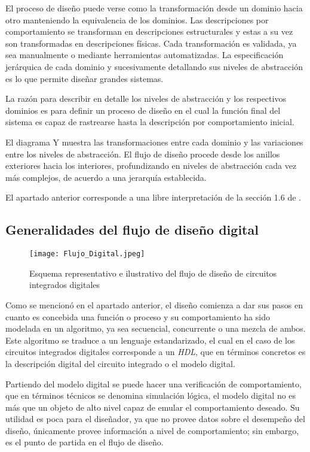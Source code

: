 {El proceso de diseño puede verse como la transformación desde un dominio hacia otro manteniendo la equivalencia de los dominios. Las descripciones por comportamiento se transforman en descripciones estructurales y estas a su vez son transformadas en descripciones físicas. Cada transformación es validada, ya sea manualmente o mediante herramientas automatizadas. La especificación jerárquica de cada dominio y sucesivamente detallando sus niveles de abstracción es lo que permite diseñar grandes sistemas. 

La razón para describir en detalle los niveles de abstracción y los respectivos dominios es para definir un proceso de diseño en el cual la función final del sistema es capaz de rastrearse hasta la descripción por comportamiento inicial.

El diagrama Y muestra las transformaciones entre cada dominio y las variaciones entre los niveles de abstracción. El flujo de diseño procede desde los anillos exteriores hacia los interiores, profundizando en niveles de abstracción cada vez más complejos, de acuerdo a una jerarquía establecida.

El apartado anterior corresponde a una libre interpretación de la sección 1.6 de \cite{book:weste2005}.

\subsection{Generalidades del flujo de diseño digital}
\label{sec:gen_d_flow}
\begin{figure}[t]
\texttt{[image: Flujo\_Digital.jpeg]}
\centering
\caption{Esquema representativo e ilustrativo del flujo de diseño de circuitos integrados digitales}
\label{Dflow1}
\end{figure}

Como se mencionó en el apartado anterior, el diseño comienza a dar sus pasos en cuanto es concebida una función o proceso y su comportamiento ha sido modelada en un algoritmo, ya sea secuencial, concurrente o una mezcla de ambos. Este algoritmo se traduce a un lenguaje estandarizado, el cual en el caso de los circuitos integrados digitales corresponde a un \textit{HDL}, que en términos concretos es la descripción digital del circuito integrado o el modelo digital.

Partiendo del modelo digital se puede hacer una verificación de comportamiento, que en términos técnicos se denomina simulación lógica, el modelo digital no es más que un objeto de alto nivel capaz de emular el comportamiento deseado. Su utilidad es poca para el diseñador, ya que no provee datos sobre el desempeño del diseño, únicamente provee 
información a nivel de comportamiento; sin embargo, es el punto de partida en el flujo de diseño.

}
